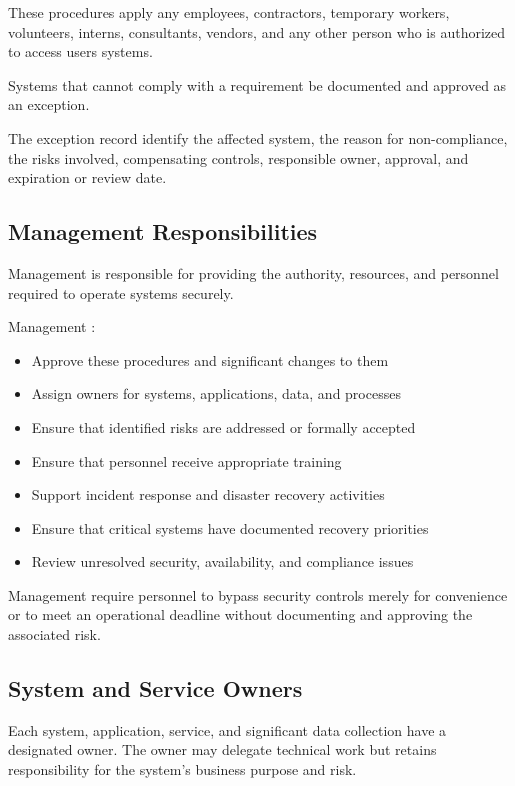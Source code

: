 These procedures apply any employees, contractors, temporary workers, volunteers, interns, consultants, vendors, and any other person who is authorized to access users systems.

Systems that cannot comply with a requirement \must{} be documented and approved as an exception. 

The exception record \must{} identify the affected system, the reason for non-compliance, the risks involved, compensating controls, responsible owner, approval, and expiration or review date.

\subsection{Management Responsibilities}

Management is responsible for providing the authority, resources, and personnel required to operate systems securely.

Management \must{}:
\begin{itemize}
    \item Approve these procedures and significant changes to them
    \item Assign owners for systems, applications, data, and processes
    \item Ensure that identified risks are addressed or formally accepted
    \item Ensure that personnel receive appropriate training
    \item Support incident response and disaster recovery activities
    \item Ensure that critical systems have documented recovery priorities
    \item Review unresolved security, availability, and compliance issues
\end{itemize}

Management \mustnot{} require personnel to bypass security controls merely for convenience or to meet an operational deadline without documenting and approving the associated risk.

\subsection{System and Service Owners}

Each system, application, service, and significant data collection \must{} have a designated owner. The owner may delegate technical work but retains responsibility for the system's business purpose and risk.

